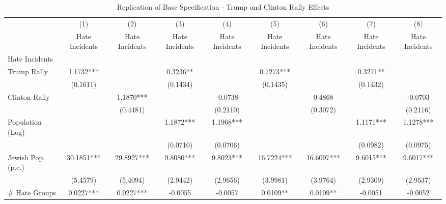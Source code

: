 \begin{table}[htbp]\centering
\def\sym#1{\ifmmode^{#1}\else\(^{#1}\)\fi}
\caption{Replication of Base Specification - Trump and Clinton Rally Effects}
\begin{tabular}{l*{8}{c}}
\hline\hline
                    &\multicolumn{1}{c}{(1)}   &\multicolumn{1}{c}{(2)}   &\multicolumn{1}{c}{(3)}   &\multicolumn{1}{c}{(4)}   &\multicolumn{1}{c}{(5)}   &\multicolumn{1}{c}{(6)}   &\multicolumn{1}{c}{(7)}   &\multicolumn{1}{c}{(8)}   \\
                    &Hate Incidents   &Hate Incidents   &Hate Incidents   &Hate Incidents   &Hate Incidents   &Hate Incidents   &Hate Incidents   &Hate Incidents   \\
\hline
Hate Incidents      &               &               &               &               &               &               &               &               \\
Trump Rally         &      1.1732***&               &      0.3236** &               &      0.7273***&               &      0.3271** &               \\
                    &    (0.1611)   &               &    (0.1434)   &               &    (0.1435)   &               &    (0.1432)   &               \\
Clinton Rally       &               &      1.1870***&               &     -0.0738   &               &      0.4868   &               &     -0.0703   \\
                    &               &    (0.4481)   &               &    (0.2110)   &               &    (0.3072)   &               &    (0.2116)   \\
Population (Log)    &               &               &      1.1872***&      1.1968***&               &               &      1.1171***&      1.1278***\\
                    &               &               &    (0.0710)   &    (0.0706)   &               &               &    (0.0982)   &    (0.0975)   \\
Jewish Pop. (p.c.)  &     30.1851***&     29.8927***&      9.8080***&      9.8023***&     16.7224***&     16.6097***&      9.6015***&      9.6017***\\
                    &    (5.4579)   &    (5.4094)   &    (2.9442)   &    (2.9656)   &    (3.9981)   &    (3.9764)   &    (2.9309)   &    (2.9537)   \\
# Hate Groups       &      0.0227***&      0.0227***&     -0.0055   &     -0.0057   &      0.0109** &      0.0109** &     -0.0051   &     -0.0052   \\

\end{tabular}
\end{table}
